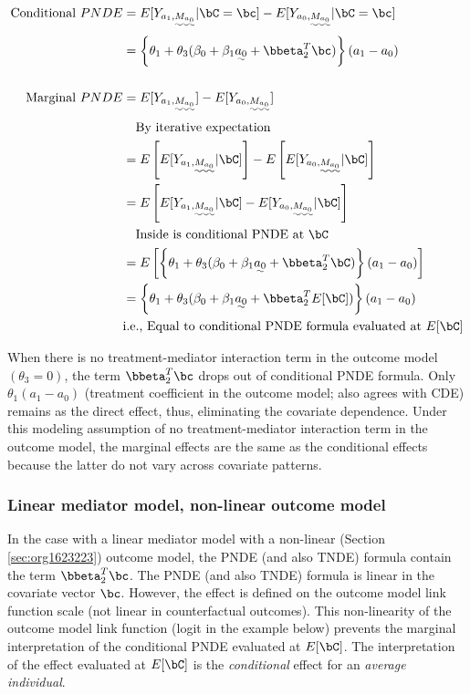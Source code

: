 \documentclass[dvipdfmx,10pt]{article}
\begin{document}
\begin{align*}
  \text{Conditional }PNDE
  &= E[Y_{a_{1},\uwave{M_{a_{0}}}} | \bC = \bc] - E[Y_{a_{0},\uwave{M_{a_{0}}}} | \bC = \bc]\\
  &= \left\{ \theta_{1} + \theta_{3}(\beta_{0} + \beta_{1}\uwave{a_{0}} + \bbeta_{2}^{T}\bc) \right\} (a_{1} - a_{0})\\
  \\
  \text{Marginal }PNDE
  &= E[Y_{a_{1},\uwave{M_{a_{0}}}}] - E[Y_{a_{0},\uwave{M_{a_{0}}}}]\\
  &~~~\text{By iterative expectation}\\
  &= E \left[ E[Y_{a_{1},\uwave{M_{a_{0}}}} | \bC] \right] -
     E \left[ E[Y_{a_{0},\uwave{M_{a_{0}}}} | \bC] \right]\\
  &= E \left[ E[Y_{a_{1},\uwave{M_{a_{0}}}} | \bC] - E[Y_{a_{0},\uwave{M_{a_{0}}}} | \bC] \right]\\
  &~~~\text{Inside is conditional PNDE at } \bC\\
  &= E\left[ \left\{ \theta_{1} + \theta_{3}(\beta_{0} + \beta_{1}\uwave{a_{0}} + \bbeta_{2}^{T}\bC) \right\} (a_{1} - a_{0}) \right]\\
  &= \left\{ \theta_{1} + \theta_{3}(\beta_{0} + \beta_{1}\uwave{a_{0}} + \bbeta_{2}^{T}E[\bC]) \right\} (a_{1} - a_{0})\\
  &\text{i.e., Equal to conditional PNDE formula evaluated at } E[\bC]\\
\end{align*}

When there is no treatment-mediator interaction term in the outcome model \((\theta_{3} = 0)\), the term \(\bbeta_{2}^{T}\bc\) drops out of conditional PNDE formula. Only \(\theta_{1}(a_{1} - a_{0})\) (treatment coefficient in the outcome model; also agrees with CDE) remains as the direct effect, thus, eliminating the covariate dependence. Under this modeling assumption of no treatment-mediator interaction term in the outcome model, the marginal effects are the same as the conditional effects because the latter do not vary across covariate patterns.

\subsubsection{Linear mediator model, non-linear outcome model}
\label{sec:org6b35b3e}
In the case with a linear mediator model with a non-linear (Section \ref{sec:org1623223}) outcome model, the PNDE (and also TNDE) formula contain the term \(\bbeta_{2}^{T}\bc\). The PNDE (and also TNDE) formula is linear in the covariate vector \(\bc\). However, the effect is defined on the outcome model link function scale (not linear in counterfactual outcomes). This non-linearity of the outcome model link function (logit in the example below) prevents the marginal interpretation of the conditional PNDE evaluated at \(E[\bC]\). The interpretation of the effect evaluated at \(E[\bC]\) is the \emph{conditional} effect for an \emph{average individual}.
\end{document}

